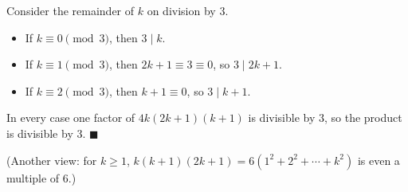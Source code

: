 Consider the remainder of $k$ on division by $3$.
\begin{itemize}
\item If $k\equiv0\pmod3$, then $3\mid k$.
\item If $k\equiv1\pmod3$, then $2k+1\equiv3\equiv0$, so $3\mid 2k+1$.
\item If $k\equiv2\pmod3$, then $k+1\equiv0$, so $3\mid k+1$.
\end{itemize}
In every case one factor of $4k(2k+1)(k+1)$ is divisible by $3$, so the product is divisible by $3$. $\blacksquare$

(Another view: for $k\ge1$, $k(k+1)(2k+1)=6(1^2+2^2+\cdots+k^2)$ is even a multiple of $6$.)
